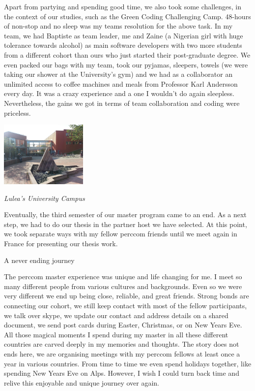 \documentclass[10pt,a4paper]{article} %
\newcommand{\NewsItem}[1]{ %
\usefont{T1}{fvs}{n}{n} %
\vspace{24pt}\large #1\vspace{3pt} %
\par \normalsize \normalfont}
\begin{document}
\begin{multicols}{3}
Apart from partying and spending good time, we also took some challenges, in the 
context of our studies, such as the Green Coding Challenging Camp.
48-hours of non-stop and no sleep was my teams resolution for the above task. 
In my team, we had Baptiste as team leader, me and Zaine (a Nigerian girl with huge 
tolerance towards alcohol) as main software developers with two more students 
from a different cohort than ours who just started their post-graduate degree.  
We even packed our bags with my team, took our pyjamas, sleepers, towels 
(we were taking our shower at the University's gym) and we had as a collaborator an 
unlimited access to coffee machines and meals from Professor Karl Andersson every 
day. 
It was a crazy experience and a one I wouldn't do again sleepless. 
Nevertheless, the gains we got in terms of team collaboration and coding were 
priceless. 


\begin{center}
	\includegraphics[width=0.32\textwidth]{media/campus_lulea.jpg}
	\par\textit{Lulea's University Campus}
\end{center}


Eventually, the third semester of our master program came to an end. 
As a next step, we had to do our thesis in the partner host we have selected. 
At this point, we took separate ways with my fellow {\sc perccom} friends 
until we meet again in France for presenting our thesis work. 




\NewsItem{A never ending journey}

The {\sc perccom} master experience was unique and life changing for me. 
I meet so many different people from various cultures and backgrounds. 
Even so we were very different we end up being close, reliable, and great friends.
Strong bonds are connecting our cohort, we still keep contact with most of the 
fellow participants, we talk over skype, we update our contact and address details 
on a shared document, we send post cards during Easter, Christmas, 
or on New Years Eve.
All those magical moments I spend during my master in all these different countries 
are carved deeply in my memories and thoughts. 
The story does not ends here, we are organising meetings with my {\sc perccom} 
fellows at least once a year in various countries. 
From time to time we even spend holidays together, like spending New Years Eve on 
Alps. 
However, I wish I could turn back time and relive this enjoyable and 
unique journey over again. 



\end{multicols}
\end{document}
